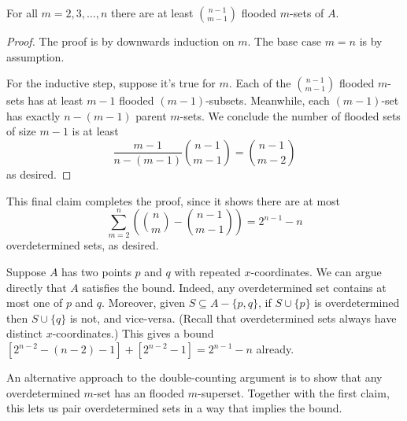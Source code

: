 \documentclass[11pt]{scrartcl}
\begin{document}
\begin{claim*}
  For all $m = 2, 3, \dots, n$ there are at least $\binom{n-1}{m-1}$
  flooded $m$-sets of $A$.
\end{claim*}
\begin{proof}
  The proof is by downwards induction on $m$.
  The base case $m = n$ is by assumption.

  For the inductive step, suppose it's true for $m$.
  Each of the $\binom{n-1}{m-1}$ flooded $m$-sets
  has at least $m-1$ flooded $(m-1)$-subsets.
  Meanwhile, each $(m-1)$-set has exactly $n-(m-1)$ parent $m$-sets.
  We conclude the number of flooded sets of size $m-1$ is at least
  \[ \frac{m-1}{n-(m-1)} \binom{n-1}{m-1} = \binom{n-1}{m-2} \]
  as desired.
\end{proof}

This final claim completes the proof,
since it shows there are at most
\[ \sum_{m=2}^n \left( \binom nm - \binom{n-1}{m-1} \right)
  = 2^{n-1} - n \]
overdetermined sets, as desired.

\begin{remark*}
  Suppose $A$ has two points $p$ and $q$ with repeated $x$-coordinates.
  We can argue directly that $A$ satisfies the bound.
  Indeed, any overdetermined set contains at most one of $p$ and $q$.
  Moreover, given $S \subseteq A - \{p,q\}$,
  if $S \cup \{p\}$ is overdetermined
  then $S \cup \{q\}$ is not, and vice-versa.
  (Recall that overdetermined sets always
  have distinct $x$-coordinates.)
  This gives a bound $\left[ 2^{n-2}-(n-2)-1 \right]
  + \left[ 2^{n-2}-1 \right] = 2^{n-1}-n$ already.
\end{remark*}

\begin{remark*}
  An alternative approach to the double-counting
  argument is to show that any overdetermined $m$-set
  has an flooded $m$-superset.
  Together with the first claim,
  this lets us pair overdetermined sets in a way
  that implies the bound.
\end{remark*}
\pagebreak
\end{document}
